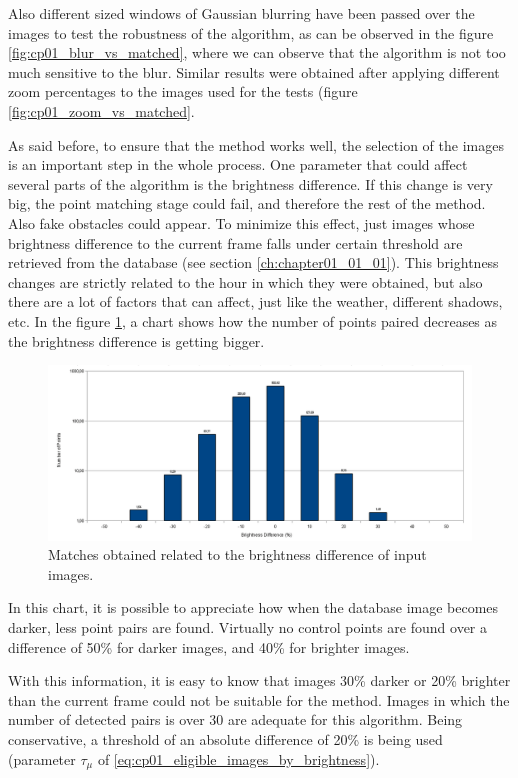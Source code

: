 Also different sized windows of Gaussian blurring have been passed over the images to test the robustness of the algorithm, as can be observed in the figure \ref{fig:cp01_blur_vs_matched}, where we can observe that the algorithm is not too much sensitive to the blur. Similar results were obtained after applying different zoom percentages to the images used for the tests (figure \ref{fig:cp01_zoom_vs_matched}.

As said before, to ensure that the method works well, the selection of the images is an important step in the whole process. One parameter that could affect several parts of the algorithm is the brightness difference. If this change is very big, the point matching stage could fail, and therefore the rest of the method. Also fake obstacles could appear. To minimize this effect, just images whose brightness difference to the current frame falls under certain threshold are retrieved from the database (see section \ref{ch:chapter01_01_01}). This brightness changes are strictly related to the hour in which they were obtained, but also there are a lot of factors that can affect, just like the weather, different shadows, etc. In the figure \ref{fig:cp01_brightness_vs_matches}, a chart shows how the number of points paired decreases as the brightness difference is getting bigger.

\begin{figure}[h!]
\centering
\includegraphics[width=\textwidth]{brightness_vs_matches}
\caption{Matches obtained related to the brightness difference of input images.}\label{fig:cp01_brightness_vs_matches}
\end{figure}

In this chart, it is possible to appreciate how when the database image becomes darker, less point pairs are found. Virtually no control points are found over a difference of 50\% for darker images, and 40\% for brighter images.

With this information, it is easy to know that images 30\% darker or 20\% brighter than the current frame could not be suitable for the method. Images in which the number of detected pairs is over 30 are adequate for this algorithm. Being conservative, a threshold of an absolute difference of 20\% is being used (parameter $\tau_{\mu}$ of \ref{eq:cp01_eligible_images_by_brightness}).

